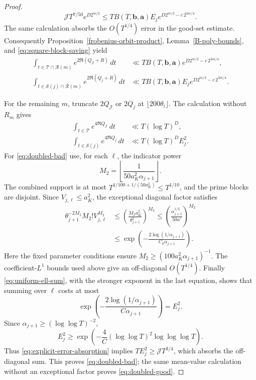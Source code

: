\documentclass[twoside,reqno,11pt,a4paper]{amsart}
\numberwithin{equation}{section}
\theoremstyle{plain}
\theoremstyle{definition}
\theoremstyle{remark}
\renewcommand{\le}{\leqslant}
\renewcommand{\ge}{\geqslant}
\begin{document}
\begin{proof}
\begin{equation*}
\mathcal J T^{7/50}e^{D2^{m/2}}
\le
TB(T,\mathbf b,\mathbf a)E_j
e^{D2^{m/2}-c\,2^{3m/4}}.
\end{equation*}
The same calculation absorbs the $O(T^{1/4})$ error in the good-set
estimate.
Consequently Proposition~\ref{frobenius-orbit-product},
Lemma~\ref{B-poly-bounds}, and \eqref{eq:square-block-saving} yield
\begin{align}
 \int_{t\in\mathcal T\cap\mathcal R(m)}e^{2\Re(Q_{\mathcal J}+R)}\,dt
 &\ll TB(T,\mathbf b,\mathbf a)
 e^{D2^{m/2}-c\,2^{3m/4}},\label{eq:square-small-good}\\
 \int_{t\in \mathcal S(j)\cap\mathcal R(m)}e^{2\Re(Q_j+R)}\,dt
 &\ll TB(T,\mathbf b,\mathbf a)E_j
 e^{D2^{m/2}-c\,2^{3m/4}}.
 \label{eq:square-small-bad}
\end{align}

For the remaining $m$, truncate $2Q_{\mathcal J}$ or $2Q_j$ at
$\lfloor200\theta_i\rfloor$.  The calculation without $R_m$ gives
\begin{align}
 \int_{t\in \mathcal T}e^{4\Re Q_{\mathcal J}}\,dt&\ll T(\log T)^D,
 \label{eq:doubled-good}\\
 \int_{t\in \mathcal S(j)}e^{4\Re Q_j}\,dt&\ll T(\log T)^D E_j^2.
 \label{eq:doubled-bad}
\end{align}
For \eqref{eq:doubled-bad} use, for each $\ell$, the indicator power
\begin{equation*}
 M_2=\left\lfloor\frac1{50a_K^2\alpha_{j+1}}\right\rfloor.
\end{equation*}
The combined support is at most
$T^{1/100+1/(50a_K^2)}\le T^{1/10}$, and the prime blocks are disjoint.
Since $V_{j,\ell}\le a_K^2$, the exceptional diagonal factor satisfies
\begin{align*}
 \theta_{j+1}^{-2M_2}M_2!V_{j,\ell}^{M_2}
 &\le\left(\frac{M_2a_K^2}{\theta_{j+1}^2}\right)^{M_2}
 \le\left(\frac{\alpha_{j+1}^{1/2}}{50a'}\right)^{M_2} \\
 &\le \exp\left(-\frac{2\log(1/\alpha_{j+1})}
 {C_0\alpha_{j+1}}\right).
\end{align*}
Here the fixed parameter conditions ensure
$M_2\ge(100a_K^2\alpha_{j+1})^{-1}$.  The coefficient-$L^1$ bounds used
above give an off-diagonal $O(T^{1/4})$.  Finally
\eqref{eq:uniform-ell-sum}, with the stronger exponent in the last equation,
shows that summing over $\ell$ costs at most
\begin{equation*}
 \exp\left(-\frac{2\log(1/\alpha_{j+1})}
 {C\alpha_{j+1}}\right)=E_j^2.
\end{equation*}
Since $\alpha_{j+1}\ge(\log\log T)^{-2}$,
\begin{equation*}
E_j^2\ge
\exp\left(-\frac4C(\log\log T)^2\log\log\log T\right).
\end{equation*}
Thus \eqref{eq:explicit-error-absorption} implies
$TE_j^2\ge\mathcal J T^{3/4}$, which absorbs the off-diagonal sum.
This proves \eqref{eq:doubled-bad}; the same mean-value calculation without
an exceptional factor proves \eqref{eq:doubled-good}.


\end{proof}
\end{document}
